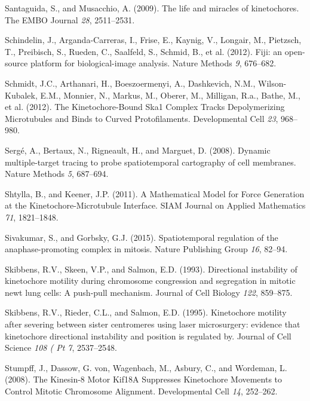 \documentclass[12pt,a4paper,twoside,openright]{book}
\begin{document}
Santaguida, S., and Musacchio, A. (2009). The life and miracles of
kinetochores. The EMBO Journal \emph{28}, 2511--2531.

Schindelin, J., Arganda-Carreras, I., Frise, E., Kaynig, V., Longair,
M., Pietzsch, T., Preibisch, S., Rueden, C., Saalfeld, S., Schmid, B.,
et al. (2012). Fiji: an open-source platform for biological-image
analysis. Nature Methods \emph{9}, 676--682.

Schmidt, J.C., Arthanari, H., Boeszoermenyi, A., Dashkevich, N.M.,
Wilson-Kubalek, E.M., Monnier, N., Markus, M., Oberer, M., Milligan,
R.a., Bathe, M., et al. (2012). The Kinetochore-Bound Ska1 Complex
Tracks Depolymerizing Microtubules and Binds to Curved Protofilaments.
Developmental Cell \emph{23}, 968--980.

Sergé, A., Bertaux, N., Rigneault, H., and Marguet, D. (2008). Dynamic
multiple-target tracing to probe spatiotemporal cartography of cell
membranes. Nature Methods \emph{5}, 687--694.

Shtylla, B., and Keener, J.P. (2011). A Mathematical Model for Force
Generation at the Kinetochore-Microtubule Interface. SIAM Journal on
Applied Mathematics \emph{71}, 1821--1848.

Sivakumar, S., and Gorbsky, G.J. (2015). Spatiotemporal regulation of
the anaphase-promoting complex in mitosis. Nature Publishing Group
\emph{16}, 82--94.

Skibbens, R.V., Skeen, V.P., and Salmon, E.D. (1993). Directional
instability of kinetochore motility during chromosome congression and
segregation in mitotic newt lung cells: A push-pull mechanism. Journal
of Cell Biology \emph{122}, 859--875.

Skibbens, R.V., Rieder, C.L., and Salmon, E.D. (1995). Kinetochore
motility after severing between sister centromeres using laser
microsurgery: evidence that kinetochore directional instability and
position is regulated by. Journal of Cell Science \emph{108 ( Pt 7},
2537--2548.

Stumpff, J., Dassow, G. von, Wagenbach, M., Asbury, C., and Wordeman, L.
(2008). The Kinesin-8 Motor Kif18A Suppresses Kinetochore Movements to
Control Mitotic Chromosome Alignment. Developmental Cell \emph{14},
252--262.
\end{document}
